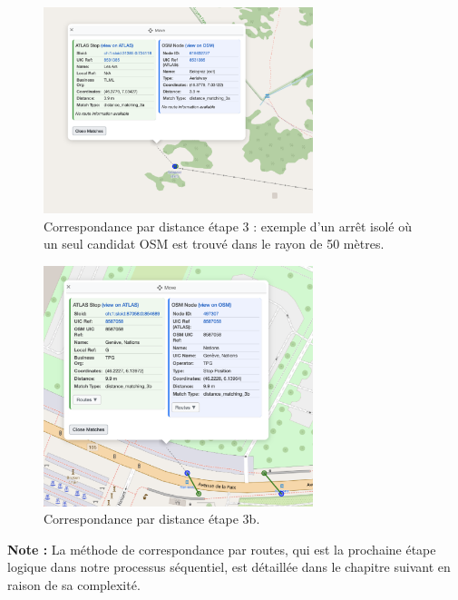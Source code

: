 \begin{figure}[h] 
    \centering
    \includegraphics[width=0.7\textwidth]{../figures/correspondances/distance_3a.png}
    \caption[Correspondance par distance – étape 3a]{Correspondance par distance étape 3 : exemple d'un arrêt isolé où un seul candidat OSM est trouvé dans le rayon de 50 mètres.}
    \label{fig:distance_stage3}
\end{figure} 
\begin{figure}[h] 
    \centering
    \includegraphics[width=0.7\textwidth]{../figures/correspondances/distance_3b.png}
    \caption[Correspondance par distance – étape 3b]{Correspondance par distance étape 3b.}
    \label{fig:distance_stage3b}
\end{figure} 

\begin{tcolorbox}[colback=blue!5, colframe=blue!50, arc=3mm, boxrule=1pt]
\textbf{Note :} La méthode de correspondance par routes, qui est la prochaine étape logique dans notre processus séquentiel, est détaillée dans le chapitre suivant en raison de sa complexité.
\end{tcolorbox}

